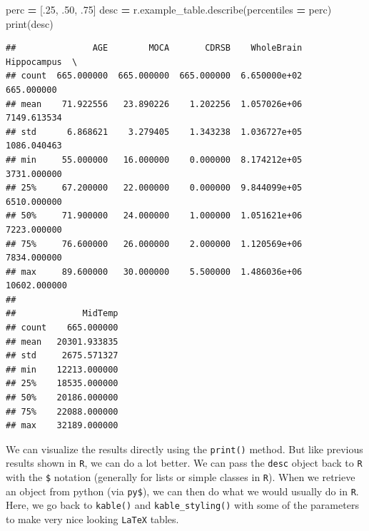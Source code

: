 \documentclass[]{article}
\newenvironment{Shaded}{\begin{snugshade}}{\end{snugshade}}
\newcommand{\BuiltInTok}[1]{#1}
\newcommand{\DataTypeTok}[1]{\textcolor[rgb]{0.13,0.29,0.53}{#1}}
\newcommand{\DecValTok}[1]{\textcolor[rgb]{0.00,0.00,0.81}{#1}}
\newcommand{\FloatTok}[1]{\textcolor[rgb]{0.00,0.00,0.81}{#1}}
\newcommand{\KeywordTok}[1]{\textcolor[rgb]{0.13,0.29,0.53}{\textbf{#1}}}
\newcommand{\NormalTok}[1]{#1}
\newcommand{\OperatorTok}[1]{\textcolor[rgb]{0.81,0.36,0.00}{\textbf{#1}}}
\newcommand{\StringTok}[1]{\textcolor[rgb]{0.31,0.60,0.02}{#1}}
\begin{document}
\begin{Shaded}
\begin{Highlighting}[]
\NormalTok{perc }\OperatorTok{=}\NormalTok{ [.}\DecValTok{25}\NormalTok{, }\FloatTok{.50}\NormalTok{, }\FloatTok{.75}\NormalTok{] }
\NormalTok{desc }\OperatorTok{=}\NormalTok{ r.example_table.describe(percentiles }\OperatorTok{=}\NormalTok{ perc)}
\BuiltInTok{print}\NormalTok{(desc)}
\end{Highlighting}
\end{Shaded}

\begin{verbatim}
##               AGE        MOCA       CDRSB    WholeBrain   Hippocampus  \
## count  665.000000  665.000000  665.000000  6.650000e+02    665.000000   
## mean    71.922556   23.890226    1.202256  1.057026e+06   7149.613534   
## std      6.868621    3.279405    1.343238  1.036727e+05   1086.040463   
## min     55.000000   16.000000    0.000000  8.174212e+05   3731.000000   
## 25%     67.200000   22.000000    0.000000  9.844099e+05   6510.000000   
## 50%     71.900000   24.000000    1.000000  1.051621e+06   7223.000000   
## 75%     76.600000   26.000000    2.000000  1.120569e+06   7834.000000   
## max     89.600000   30.000000    5.500000  1.486036e+06  10602.000000   
## 
##             MidTemp  
## count    665.000000  
## mean   20301.933835  
## std     2675.571327  
## min    12213.000000  
## 25%    18535.000000  
## 50%    20186.000000  
## 75%    22088.000000  
## max    32189.000000
\end{verbatim}

We can visualize the results directly using the \texttt{print()} method.
But like previous results shown in \texttt{R}, we can do a lot better.
We can pass the \texttt{desc} object back to \texttt{R} with the
\texttt{\$} notation (generally for lists or simple classes in
\texttt{R}). When we retrieve an object from python (via \texttt{py\$}),
we can then do what we would usually do in \texttt{R}. Here, we go back
to \texttt{kable()} and \texttt{kable\_styling()} with some of the
parameters to make very nice looking \texttt{LaTeX} tables.

\begin{Shaded}
\end{Shaded}
\end{document}
